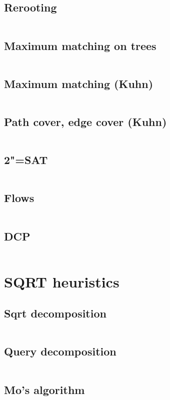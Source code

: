 ﻿\documentclass[10pt,twocolumn,oneside]{article}
\begin{document}
\subsection{Rerooting}
\inputminted[breaklines]{cpp}{Graph algorithms/rerooting.cpp}
\subsection{Maximum matching on trees}
\inputminted[breaklines]{cpp}{Graph algorithms/maximum matching on trees.cpp}
\subsection{Maximum matching (Kuhn)}
\inputminted[breaklines]{cpp}{Graph algorithms/kuhn (with optimizations).cpp}
\subsection{Path cover, edge cover (Kuhn)}
\inputminted[breaklines]{cpp}{Graph algorithms/path cover + edge cover (kuhn).cpp}
\subsection{2"=SAT}
\inputminted[breaklines]{cpp}{Graph algorithms/2-sat.cpp}
\subsection{Flows}
\inputminted[breaklines]{cpp}{Graph algorithms/flows.cpp}
\subsection{DCP}
\inputminted[breaklines]{cpp}{Graph algorithms/dcp.cpp}

\section{SQRT heuristics}
\subsection{Sqrt decomposition}
\inputminted[breaklines]{python}{SQRT heuristics/sqrt decomposition.py}
\subsection{Query decomposition}
\inputminted[breaklines]{cpp}{SQRT heuristics/query decomposition.cpp}
\subsection{Mo's algorithm}
\inputminted[breaklines]{cpp}{SQRT heuristics/mo's algorithm.cpp}
\end{document}
